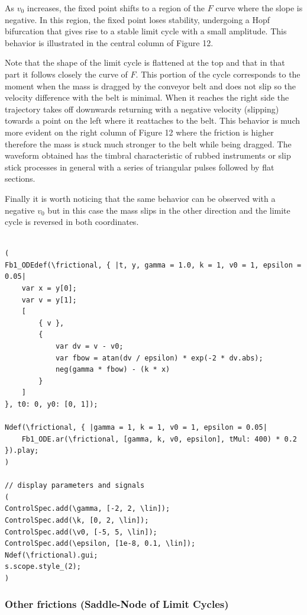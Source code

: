 \documentclass{article}
\begin{document}
As $v_0$ increases, the fixed point shifts to a region of the  $F$ curve where the slope is negative. In this region, the fixed point loses stability, undergoing a Hopf bifurcation that gives rise to a stable limit cycle with a small amplitude. 
This behavior is illustrated in the central column of Figure 12.

Note that the shape of the limit cycle is flattened at the top and that in that part it follows closely the curve of $F$. 
This portion of the cycle corresponds to the moment when the mass is dragged by the conveyor belt and does not slip so the velocity difference with the belt is minimal. 
When it reaches the right side the trajectory takes off downwards returning with a negative velocity (slipping) towards a point on the left where it reattaches to the belt. 
This behavior is much more evident on the right column of Figure 12 where the friction is higher therefore the mass is stuck much stronger to the belt while being dragged. 
The waveform obtained has the timbral characteristic of rubbed instruments or slip stick processes in general with a series of triangular pulses followed by flat sections.

Finally it is worth noticing that the same behavior can be observed with a negative $v_0$ but in this case the mass slips in the other direction and the limite cycle is reversed in both coordinates.

\begin{lstlisting}[frame=single,caption=A dynamical system with stick slip friction.]

(
Fb1_ODEdef(\frictional, { |t, y, gamma = 1.0, k = 1, v0 = 1, epsilon = 0.05|
	var x = y[0];
	var v = y[1];
	[
		{ v },
		{
			var dv = v - v0;
			var fbow = atan(dv / epsilon) * exp(-2 * dv.abs);
			neg(gamma * fbow) - (k * x)
		}
	]
}, t0: 0, y0: [0, 1]);

Ndef(\frictional, { |gamma = 1, k = 1, v0 = 1, epsilon = 0.05|
	Fb1_ODE.ar(\frictional, [gamma, k, v0, epsilon], tMul: 400) * 0.2
}).play;
)

// display parameters and signals
(
ControlSpec.add(\gamma, [-2, 2, \lin]);
ControlSpec.add(\k, [0, 2, \lin]);
ControlSpec.add(\v0, [-5, 5, \lin]);
ControlSpec.add(\epsilon, [1e-8, 0.1, \lin]);
Ndef(\frictional).gui;
s.scope.style_(2);
)

\end{lstlisting}


\subsubsection{Other frictions (Saddle-Node of Limit Cycles)}
\end{document}
